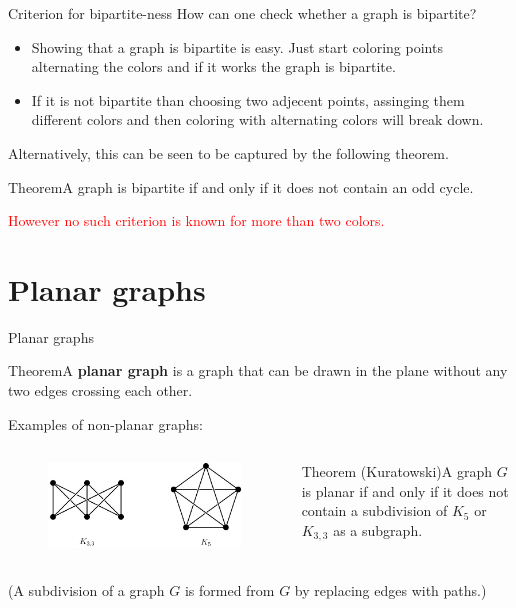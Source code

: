 \documentclass{beamer}
\def\bl[#1]#2{\begin{block}{#1}#2\end{block}}
\def\itemb{\begin{itemize}}
\def\iteme{\end{itemize}}
\begin{document}
\begin{frame}{Criterion for bipartite-ness}
How can one check whether a graph is bipartite?
\itemb
\item Showing that a graph is bipartite is easy. Just start coloring points alternating the colors and if it works the graph is bipartite.
\item If it is not bipartite than choosing two adjecent points, assinging them different colors and then coloring with alternating colors will break down.
\iteme
Alternatively, this can be seen to be captured by the following theorem.
\bl[Theorem]{A graph is bipartite if and only if it does not contain an odd cycle.}\vspace{-0.3cm}
\center\textcolor{red}{However no such criterion is known for more than two colors.}
\end{frame}

\section{Planar graphs}

\begin{frame}{Planar graphs}
\bl[Theorem]{A \textbf{planar graph} is a graph that can be drawn in the plane without any two edges crossing each other.}
Examples of non-planar graphs:\vspace{-0.2cm}
\begin{columns}
\begin{figure}
\centering
\includegraphics[scale=0.5]{kuratowski2.jpg}
\end{figure}
\bl[Theorem (Kuratowski)]{A graph $G$ is planar if and only if it does not contain a subdivision of $K_5$ or $K_{3,3}$ as a subgraph.}

\end{columns}\vspace{0.2cm}
(A subdivision of a graph $G$ is formed from $G$ by replacing edges with paths.)\end{frame}
\end{document}
